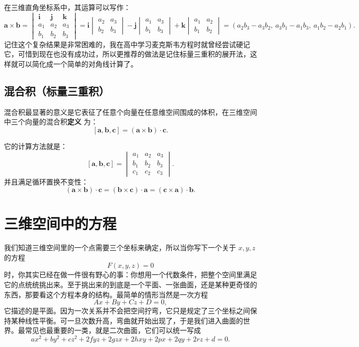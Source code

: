 \documentclass[UTF8]{ctexbook}
\begin{document}
在三维直角坐标系中，其运算可以写作：
\[
\mathbf{a}\times\mathbf{b}
=\begin{vmatrix}
\mathbf{i} & \mathbf{j} & \mathbf{k}\\
a_1 & a_2 & a_3\\
b_1 & b_2 & b_3
\end{vmatrix}
=\mathbf{i}\begin{vmatrix}
a_2 & a_3\\
b_2 & b_3
\end{vmatrix}
-\mathbf{j}\begin{vmatrix}
a_1 & a_3\\
b_1 & b_3
\end{vmatrix}
+\mathbf{k}\begin{vmatrix}
a_1 & a_2\\
b_1 & b_2
\end{vmatrix}
=(a_2b_3-a_3b_2,\ a_3b_1-a_1b_3,\ a_1b_2-a_2b_1).
\]
记住这个复杂结果是非常困难的，我在高中学习麦克斯韦方程时就曾经尝试硬记它，可惜到现在也没有成功过，所以更推荐的做法是记住标量三重积的展开法，这样就可以简化成一个简单的对角线计算了。

\subsection{混合积（标量三重积）}

混合积最显著的意义是它表征了任意个向量在任意维空间围成的体积，在三维空间中三个向量的混合积\textbf{定义} 为：
\[
[\mathbf{a},\mathbf{b},\mathbf{c}]
=(\mathbf{a}\times\mathbf{b})\cdot\mathbf{c}.
\]


它的计算方法就是：
\[
[\mathbf{a},\mathbf{b},\mathbf{c}]
=\begin{vmatrix}
a_1 & a_2 & a_3\\
b_1 & b_2 & b_3\\
c_1 & c_2 & c_3
\end{vmatrix}.
\]
并且满足循环置换不变性：
\[
(\mathbf{a}\times\mathbf{b})\cdot\mathbf{c}
=(\mathbf{b}\times\mathbf{c})\cdot\mathbf{a}
=(\mathbf{c}\times\mathbf{a})\cdot\mathbf{b}.
\]


\newpage

\section{三维空间中的方程}

我们知道三维空间里的一个点需要三个坐标来确定，所以当你写下一个关于 $x,y,z$ 的方程
\[
F(x,y,z)=0
\]
时，你其实已经在做一件很有野心的事：你想用一个代数条件，把整个空间里满足它的点统统挑出来。至于挑出来的到底是一个平面、一张曲面，还是某种更奇怪的东西，那要看这个方程本身的结构。最简单的情形当然是一次方程
\[
Ax+By+Cz+D=0,
\]
它描述的是平面。因为一次关系并不会把空间拧弯，它只是规定了三个坐标之间保持某种线性平衡。可一旦次数升高，弯曲就开始出现了，于是我们进入曲面的世界。最常见也最重要的一类，就是二次曲面，它们可以统一写成
\[
ax^2+by^2+cz^2+2fyz+2gzx+2hxy+2px+2qy+2rz+d=0.
\]
\end{document}
